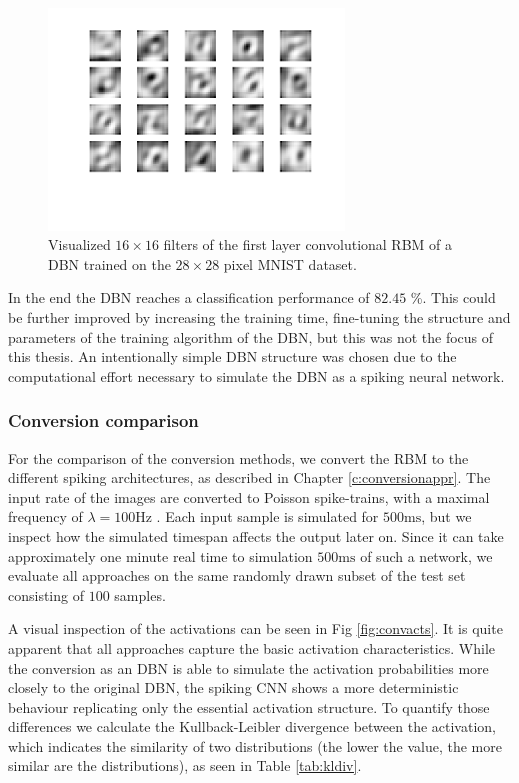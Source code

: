 \begin{figure}[h!]
	\centering
    	\includegraphics[width=0.7\textwidth]{imgs/weights_rbm.png} 
    \caption{Visualized $16 \times 16$ filters of the first layer convolutional RBM of a DBN trained on the $28 \times 28$ pixel MNIST dataset.}
	\label{fig:rbmw}
\end{figure}

In the end the DBN reaches a classification performance of $82.45$ \%. 
This could be further improved by increasing the training time, fine-tuning the structure and parameters of the training algorithm of the DBN, but this was not the focus of this thesis.
An intentionally simple DBN structure was chosen due to the computational effort necessary to simulate the DBN as a spiking neural network. 


\subsubsection{Conversion comparison} \label{c:conversioncomp}

For the comparison of the conversion methods, we convert the RBM to the different spiking architectures, as described in Chapter \ref{c:conversionappr}. 
The input rate of the images are converted to Poisson spike-trains, with a maximal frequency of $\lambda = 100 \text{Hz}$ .
Each input sample is simulated for $500 \text{ms}$, but we inspect how the simulated timespan affects the output later on.
Since it can take approximately one minute real time to simulation $500 \text{ms}$ of such a network, we evaluate all approaches on the same randomly drawn subset of the test set consisting of $100$ samples.

A visual inspection of the activations can be seen in Fig \ref{fig:convacts}. 
It is quite apparent that all approaches capture the basic activation characteristics. 
While the conversion as an DBN is able to simulate the activation probabilities more closely to the original DBN, the spiking CNN shows a more deterministic behaviour replicating only the essential activation structure.
To quantify those differences we calculate the Kullback-Leibler divergence between the activation, which indicates the similarity of two distributions (the lower the value, the more similar are the distributions), as seen in Table \ref{tab:kldiv}.



